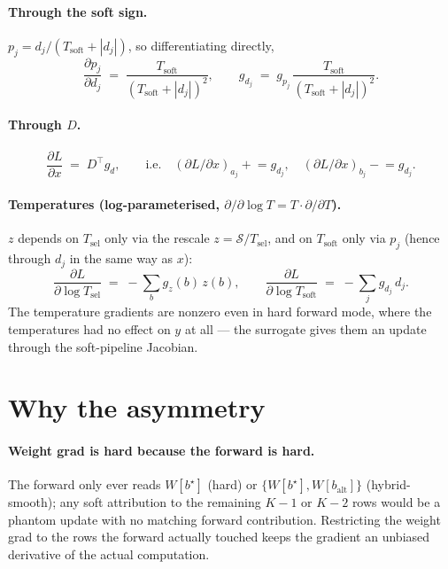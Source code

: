 \documentclass[11pt]{article}
\newcommand{\Tsel}{T_{\mathrm{sel}}}
\newcommand{\Tsoft}{T_{\mathrm{soft}}}
\newcommand{\bstar}{b^{\star}}
\begin{document}
\paragraph{Through the soft sign.} $p_j = d_j/(\Tsoft + |d_j|)$, so differentiating directly,
\[
\frac{\partial p_j}{\partial d_j} \;=\; \frac{\Tsoft}{(\Tsoft + |d_j|)^2},
\qquad
g_{d_j} \;=\; g_{p_j}\,\frac{\Tsoft}{(\Tsoft + |d_j|)^2}.
\]

\paragraph{Through $D$.}
\[
\frac{\partial L}{\partial x} \;=\; D^{\top} g_d, \qquad \text{i.e.}\quad
(\partial L/\partial x)_{a_j} \mathrel{+}= g_{d_j}, \quad (\partial L/\partial x)_{b_j} \mathrel{-}= g_{d_j}.
\]

\paragraph{Temperatures (log-parameterised, $\partial/\partial \log T = T \cdot \partial/\partial T$).}
$z$ depends on $\Tsel$ only via the rescale $z = \mathcal S / \Tsel$, and on $\Tsoft$ only via $p_j$ (hence through $d_j$ in the same way as $x$):
\[
\boxed{\;
\frac{\partial L}{\partial \log \Tsel} \;=\; -\sum_b g_z(b)\,z(b),
\qquad
\frac{\partial L}{\partial \log \Tsoft} \;=\; -\sum_j g_{d_j}\,d_j.
\;}
\]
The temperature gradients are nonzero even in hard forward mode, where the temperatures had no effect on $y$ at all — the surrogate gives them an update through the soft-pipeline Jacobian.

\section{Why the asymmetry}

\paragraph{Weight grad is hard because the forward is hard.}
The forward only ever reads $W[\bstar]$ (hard) or $\{W[\bstar], W[b_{\text{alt}}]\}$ (hybrid-smooth); any soft attribution to the remaining $K{-}1$ or $K{-}2$ rows would be a phantom update with no matching forward contribution. Restricting the weight grad to the rows the forward actually touched keeps the gradient an unbiased derivative of the actual computation.
\end{document}
